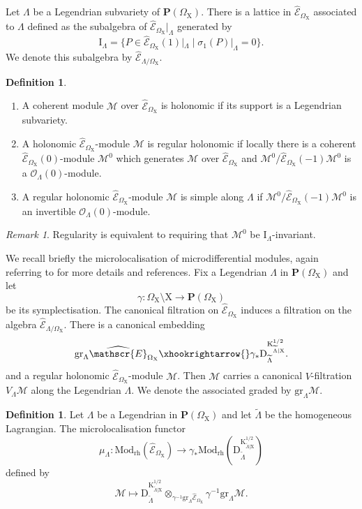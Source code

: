 \documentclass{article}
\theoremstyle{plain}
\theoremstyle{definition}
\newtheorem{definition}[theorem]{Definition}
\theoremstyle{remark}
\newtheorem{remark}[theorem]{Remark}
\newcommand{\Em}{\widehat{\mathscr{E}}_{\Omega_\mr{X}}}
\newcommand{\mr}{\mathrm}
\newcommand{\3}{\vspace{3mm}}
\newcommand{\2}{\vspace{2mm}}
\newcommand{\1}{\vspace{1mm}}
\begin{document}
 Let $\Lambda$ be a Legendrian subvariety of $\mr{\mathbf{P}}(\Omega_\mr{X})$. There is a lattice in $\Em$ associated to $\Lambda$ defined as the subalgebra of $\Em|_\Lambda$ generated by $$\mr{I}_\Lambda=\{P\in \Em(1)|_\Lambda \; |\; \sigma_1(P)|_\Lambda=0\}.$$ We denote this subalgebra by $\widehat{\mathscr{E}}_{\Lambda/\Omega_\mr{X}}$.
 \2
 \begin{definition}
 \begin{enumerate}
 \item A coherent module $\mathscr{M}$ over $\Em$ is holonomic if its support is a Legendrian subvariety.
 \item A holonomic $\Em$-module $\mathscr{M}$ is regular holonomic if  locally there is a coherent $\Em(0)$-module $\mathscr{M}^0$ which generates $\mathscr{M}$ over $\Em$ and $\mathscr{M}^0/\Em(-1)\mathscr{M}^0$ is a $\mathscr{O}_\Lambda(0)$-module.
 \item A regular holonomic $\Em$-module $\mathscr{M}$ is simple along $\Lambda$ if $\mathscr{M}^0/\Em(-1)\mathscr{M}^0$ is an invertible $\mathscr{O}_\Lambda(0)$-module.
 \end{enumerate}
 \end{definition}
 \2
 \begin{remark}
 Regularity is equivalent to requiring that $\mathscr{M}^0$ be $\mr{I}_\Lambda$-invariant.
 \end{remark}
We recall briefly the microlocalisation of microdifferential modules, again referring to \cite{saf} for more details and references. Fix a Legendrian $\Lambda$ in $\mr{\mathbf{P}}(\Omega_\mr{X})$ and let $$\gamma :\Omega_\mr{X}\setminus \mr{X}\to \mathbf{P}(\Omega_\mr{X})$$ be its symplectisation. The canonical filtration on $\Em$ induces a filtration on the algebra $\widehat{\mathscr{E}}_{\Lambda/\Omega_\mr{X}}$. There is a canonical embedding $$\mr{gr}_\Lambda\Em\xhookrightarrow{} \gamma_*\mr{D}_{\widetilde{\Lambda}}^{\mr{K}_{\widetilde{\Lambda}|\mr{X}}^{1/2}}.$$ and a regular holonomic $\Em$-module $\mathscr{M}$. Then $\mathscr{M}$ carries a canonical $V$-filtration $V_{\Lambda}\mathscr{M}$ along the Legendrian $\Lambda$. We denote the associated graded by $\mr{gr}_\Lambda\mathscr{M}$.
\2
\begin{definition}
Let $\Lambda$ be a Legendrian in $\mr{\mathbf{P}}(\Omega_\mr{X})$ and let $\widetilde{\Lambda}$ be the homogeneous Lagrangian. The microlocalisation functor $$\mu_\Lambda: \mr{Mod}_\mr{rh}\left(\Em\right)\to \gamma_*\mr{Mod}_\mr{rh}\left(\mr{D}_{\widetilde{\Lambda}}^{\mr{K}_{\widetilde{\Lambda}|\mr{X}}^{1/2}}\right)$$ defined by $$\mathscr{M}\mapsto \mr{D}_{\widetilde{\Lambda}}^{\mr{K}_{\widetilde{\Lambda}|\mr{X}}^{1/2}}\otimes_{\gamma^{-1}{\mr{gr}_\Lambda\Em}}\gamma^{-1}\mr{gr}_\Lambda\mathscr{M}.$$
\end{definition}
\end{document}
